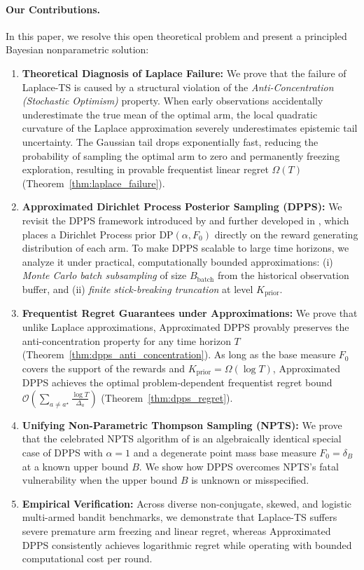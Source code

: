 \documentclass[twoside]{article}
\begin{document}
\paragraph{Our Contributions.}
In this paper, we resolve this open theoretical problem and present a principled Bayesian nonparametric solution:
\begin{enumerate}
    \item \textbf{Theoretical Diagnosis of Laplace Failure:} We prove that the failure of Laplace-TS is caused by a structural violation of the \emph{Anti-Concentration (Stochastic Optimism)} property. When early observations accidentally underestimate the true mean of the optimal arm, the local quadratic curvature of the Laplace approximation severely underestimates epistemic tail uncertainty. The Gaussian tail drops exponentially fast, reducing the probability of sampling the optimal arm to zero and permanently freezing exploration, resulting in provable frequentist linear regret $\Omega(T)$ (Theorem~\ref{thm:laplace_failure}).
    \item \textbf{Approximated Dirichlet Process Posterior Sampling (DPPS):} We revisit the DPPS framework introduced by \citet{vashishtha2025leveraging} and further developed in \citet{vashishtha2026tmlr, vashishtha2026thesis}, which places a Dirichlet Process prior $\text{DP}(\alpha, F_0)$ directly on the reward generating distribution of each arm. To make DPPS scalable to large time horizons, we analyze it under practical, computationally bounded approximations: (i) \emph{Monte Carlo batch subsampling} of size $B_{\text{batch}}$ from the historical observation buffer, and (ii) \emph{finite stick-breaking truncation} at level $K_{\text{prior}}$.
    \item \textbf{Frequentist Regret Guarantees under Approximations:} We prove that unlike Laplace approximations, Approximated DPPS provably preserves the anti-concentration property for any time horizon $T$ (Theorem~\ref{thm:dpps_anti_concentration}). As long as the base measure $F_0$ covers the support of the rewards and $K_{\text{prior}} = \Omega(\log T)$, Approximated DPPS achieves the optimal problem-dependent frequentist regret bound $\mathcal{O}\left(\sum_{a \ne a^\star} \frac{\log T}{\Delta_a}\right)$ (Theorem~\ref{thm:dpps_regret}).
    \item \textbf{Unifying Non-Parametric Thompson Sampling (NPTS):} We prove that the celebrated NPTS algorithm of \citet{riou2020bandit} is an algebraically identical special case of DPPS with $\alpha = 1$ and a degenerate point mass base measure $F_0 = \delta_B$ at a known upper bound $B$. We show how DPPS overcomes NPTS's fatal vulnerability when the upper bound $B$ is unknown or misspecified.
    \item \textbf{Empirical Verification:} Across diverse non-conjugate, skewed, and logistic multi-armed bandit benchmarks, we demonstrate that Laplace-TS suffers severe premature arm freezing and linear regret, whereas Approximated DPPS consistently achieves logarithmic regret while operating with bounded computational cost per round.
\end{enumerate}
\end{document}
